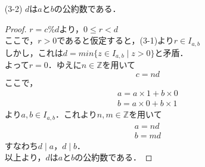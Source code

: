\documentclass[a4paper,12pt]{ltjsarticle}
\newcommand{\Z}{\mathbb{Z}}
\begin{document}
\begin{enumerate}[(1)]
\begin{enumerate}
\begin{proof}
                    $r = c \% d$より，$n \in \Z$を用いて
                    \begin{align*}
                        c &= nd + r \\
                        r &= c - nd \\
                          &= (ax_c + by_c) - n(ax_d + by_d) \\
                          &= a(x_c - nx_d) + b(y_c - ny_d)
                    \end{align*}
                    よって，$r \in I_{a,b}$
                \end{proof}
            \item[(3-2)] $d$は$a$と$b$の公約数である．
                \begin{proof}
                    $r = c \% d$より，$0 \leq r < d$ \\
                    ここで，$r > 0$であると仮定すると，(3-1)より$r \in I_{a,b}$ \\
                    しかし，これは$d = min\{ z \in I_{a,b} \mid z > 0 \}$と矛盾． \\
                    よって$r = 0$．ゆえに$n \in \Z$を用いて
                    \begin{equation*}
                        c = nd
                    \end{equation*}
                    ここで，
                    \begin{gather*}
                        a = a \times 1 + b \times 0 \\
                        b = a \times 0 + b \times 1
                    \end{gather*}
                    より$a,b \in I_{a,b}$．これより$n,m \in \Z$を用いて
                    \begin{gather*}
                        a = nd \\
                        b = md
                    \end{gather*}
                    すなわち$d \mid a$，$d \mid b$． \\
                    以上より，$d$は$a$と$b$の公約数である．
                \end{proof}
        \end{enumerate}
\end{enumerate}
\end{document}
